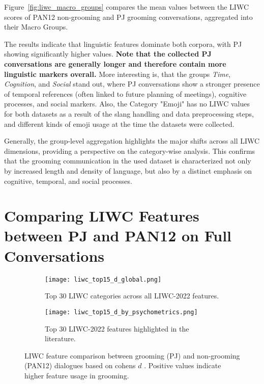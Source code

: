 Figure~\ref{fig:liwc_macro_groups} compares the mean values between the LIWC scores of PAN12 non-grooming and PJ grooming conversations, aggregated into their Macro Groups.

The results indicate that linguistic features dominate both corpora, with PJ showing significantly higher values. \textbf{Note that the collected PJ conversations are generally longer and therefore contain more linguistic markers overall.} More interesting is, that the groups \textit{Time}, \textit{Cognition}, and \textit{Social} stand out, where PJ conversations show a stronger presence of temporal references (often linked to future planning of meetings), cognitive processes, and social markers. Also, the Category "Emoji" has no LIWC values for both datasets as a result of the slang handling and data preprocessing steps, and different kinds of emoji usage at the time the datasets were collected.

Generally, the group-level aggregation highlights the major shifts across all LIWC dimensions, providing a perspective on the category-wise analysis. This confirms that the grooming communication in the used dataset is characterized not only by increased length and density of language, but also by a distinct emphasis on cognitive, temporal, and social processes.


\section{Comparing LIWC Features between PJ and PAN12 on Full Conversations} \label{sec:liwc_global_analysis}

\begin{figure}[ht]
    \centering
    \begin{subfigure}[t]{0.48\textwidth}
        \centering
        \texttt{[image: liwc\_top15\_d\_global.png]}
        \caption{Top 30 LIWC categories across all LIWC-2022 features.}
    \end{subfigure}
    \hfill
    \begin{subfigure}[t]{0.48\textwidth}
        \centering
        \texttt{[image: liwc\_top15\_d\_by\_psychometrics.png]}
        \caption{Top 30 LIWC-2022 features highlighted in the literature.}
    \end{subfigure}
    \caption[LIWC feature Comparison (PJ, PAN12) over Complete Conversations]{LIWC feature comparison between grooming (PJ) and non-grooming (PAN12) dialogues based on cohens $d$ \cite{cohen1988}. Positive values indicate higher feature usage in grooming.}
    \label{fig:liwc_global_analysis}
\end{figure}

